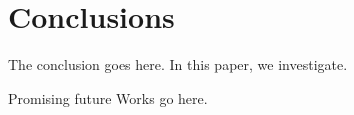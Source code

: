 \documentclass[conference]{IEEEtran}
\begin{document}

\section{Conclusions} \label{conclusion}
The conclusion goes here. In this paper, we investigate.

Promising future Works go here.












\end{document}
